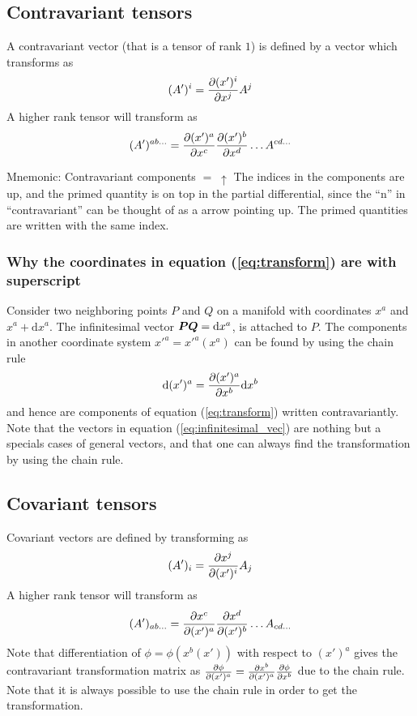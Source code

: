 \documentclass[a4paper, 12pt]{article}
\begin{document}
\subsection{Contravariant tensors}
A contravariant vector (that is a tensor of rank $1$) is defined by a vector
which transforms as
%
\begin{align*}
 (A')^i = \frac{\partial {(x')^i}}{\partial{x^j}} A^j
\end{align*}
%
A higher rank tensor will transform as
%
\begin{align*}
 (A')^{ab\ldots} = \frac{\partial {(x')^{a}}}{\partial{x^{c}}}\frac{\partial {(x')^{b}}}{\partial{x^{d}}}\ldots
A^{cd\ldots}
\end{align*}
%

\vspace{0.5cm}
\begin{greenbox}{Mnemonic: Contravariant components $= \; \uparrow$}
 The indices in the components are up, and the primed quantity is on
top in the partial differential, since the ``n'' in ``contravariant'' can be
thought of as a arrow pointing up. The primed quantities are written with the
same index.
\end{greenbox}
%
\subsubsection{Why the coordinates in equation (\ref{eq:transform}) are with
superscript}
Consider two neighboring points $P$ and $Q$ on a manifold with coordinates
$x^a$ and $x^a + \text{d}x^a$. The infinitesimal vector $\boldsymbol{PQ} =
\text{d}x^a$, is attached to $P$. The components in another coordinate system
$x'^a=x'^a(x^a)$ can be found by using the chain rule
%
\begin{align}
 \text{d}(x')^a = \frac{\partial {(x')^a}}{\partial{x^b}}\text{d}x^b \label{eq:infinitesimal_vec}
\end{align}
%
and hence are components of equation (\ref{eq:transform}) written
contravariantly. Note that the vectors in equation (\ref{eq:infinitesimal_vec})
are nothing but a specials cases of general vectors, and that one can always
find the transformation by using the chain rule.



\subsection{Covariant tensors}
Covariant vectors are defined by transforming as
%
\begin{align*}
 (A')_i = \frac{\partial {x^j}}{\partial{(x')^i}} A_j
\end{align*}
%
A higher rank tensor will transform as
%
\begin{align*}
 (A')_{ab\ldots} = \frac{\partial {x^{c}}}{\partial{(x')^{a}}}\frac{\partial {x^{d}}}{\partial{(x')^{b}}}\ldots
A_{cd\ldots}
\end{align*}
%
Note that differentiation of $\phi=\phi(x^b(x'))$ with respect to $(x')^a$
gives the contravariant transformation matrix as
$\frac{\partial {\phi}}{\partial{(x')^a}}=\frac{\partial {x^b}}{\partial{(x')^a}}\frac{\partial {\phi}}{\partial{x^b}}$ due to the chain
rule. Note that it is always possible to use the chain rule in order to get
the transformation\label{foot:phi}.
\end{document}
